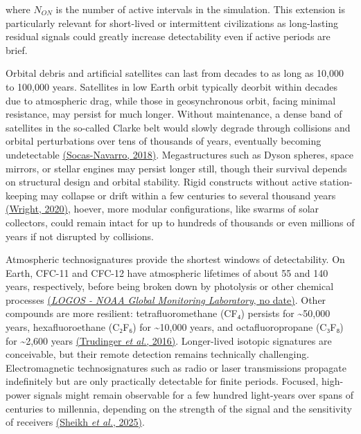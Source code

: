 where \(N_{ON}\) is the number of active intervals in the simulation. This extension is particularly relevant for short-lived or intermittent civilizations as long-lasting residual signals could greatly increase detectability even if active periods are brief.

Orbital debris and artificial satellites can last from decades to as long as 10,000 to 100,000 years. Satellites in low Earth orbit typically deorbit within decades due to atmospheric drag, while those in geosynchronous orbit, facing minimal resistance, may persist for much longer. Without maintenance, a dense band of satellites in the so-called Clarke belt would slowly degrade through collisions and orbital perturbations over tens of thousands of years, eventually becoming undetectable \href{https://paperpile.com/c/hQuIW4/EjlN}{(Socas-Navarro, 2018)}. Megastructures such as Dyson spheres, space mirrors, or stellar engines may persist longer still, though their survival depends on structural design and orbital stability. Rigid constructs without active station-keeping may collapse or drift within a few centuries to several thousand years \href{https://paperpile.com/c/hQuIW4/vLy8}{(Wright, 2020)}, hoever, more modular configurations, like swarms of solar collectors, could remain intact for up to hundreds of thousands or even millions of years if not disrupted by collisions.

Atmospheric technosignatures provide the shortest windows of detectability. On Earth, CFC-11 and CFC-12 have atmospheric lifetimes of about 55 and 140 years, respectively, before being broken down by photolysis or other chemical processes \href{https://paperpile.com/c/hQuIW4/zmLw}{(\emph{LOGOS - NOAA Global Monitoring Laboratory}, no date)}. Other compounds are more resilient: tetrafluoromethane (CF₄) persists for \textasciitilde50,000 years, hexafluoroethane (C₂F₆) for \textasciitilde10,000 years, and octafluoropropane (C₃F₈) for \textasciitilde2,600 years \href{https://paperpile.com/c/hQuIW4/tKVa}{(Trudinger \emph{et al.}, 2016)}. Longer-lived isotopic signatures are conceivable, but their remote detection remains technically challenging. Electromagnetic technosignatures such as radio or laser transmissions propagate indefinitely but are only practically detectable for finite periods. Focused, high-power signals might remain observable for a few hundred light-years over spans of centuries to millennia, depending on the strength of the signal and the sensitivity of receivers \href{https://paperpile.com/c/hQuIW4/rbOz}{(Sheikh \emph{et al.}, 2025)}.

